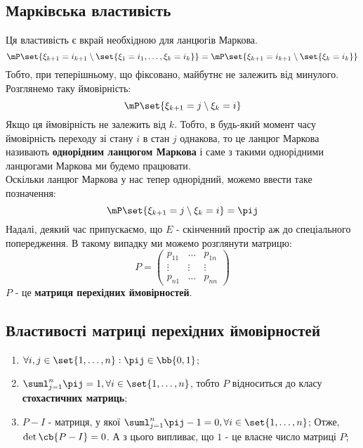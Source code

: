 \subsection{Марківська властивість}
Ця властивість є вкрай необхідною для ланцюгів Маркова.
\begin{equation}
\mP\set{\xi_{k+1}=i_{k+1}\setminus\set{\xi_1=i_1,\ldots,\xi_k=i_k}} = \mP\set{\xi_{k+1}=i_{k+1}\setminus\set{\xi_k=i_k}}
\end{equation}
Тобто, при теперішньому, що фіксовано, майбутнє не залежить від минулого.
Розглянемо таку ймовірність:
\begin{equation}
\mP\set{\xi_{k+1}=j\setminus \xi_k=i}
\end{equation}
Якщо ця ймовірність не залежить від $k$. Тобто, в будь-який момент часу ймовірність переходу зі стану $i$ в стан $j$ однакова, то це ланцюг Маркова називають \textbf{однорідним ланцюгом Маркова} і саме з такими однорідними ланцюгами Маркова ми будемо працювати.\\
Оскільки ланцюг Маркова у нас тепер однорідний, можемо ввести таке позначення:
\begin{equation}
\mP\set{\xi_{k+1}=j\setminus \xi_k=i} = \pij
\end{equation}
Надалі, деякий час припускаємо, що $E$ - скінченний простір аж до спеціального попередження. В такому випадку ми можемо розглянути матрицю:
\begin{equation}
P = \begin{pmatrix}
p_{11} & \ldots &p_{1n}\\
\vdots & \vdots & \vdots\\
p_{n1} & \ldots & p_{nn} 
\end{pmatrix}
\end{equation}
$P$ - це \textbf{матриця перехідних ймовірностей}.
\subsection{Властивості матриці перехідних ймовірностей}
\begin{enumerate}
\item $\forall i,j\in\set{1,\ldots,n}:\pij\in\bb{0,1}$;
\item $\suml_{j=1}^n \pij = 1,\forall i\in\set{1,\ldots,n}$, тобто $P$ відноситься до класу \textbf{стохастичних матриць};
\item $P-I$ - матриця, у якої $\suml_{j=1}^n \pij-1 = 0,\forall i\in\set{1,\ldots,n}$; Отже, $\det\cb{P-I}=0$. А з цього випливає, що $1$ - це власне число матриці $P$;
\end{enumerate}
